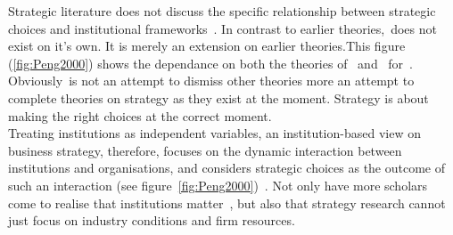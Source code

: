 Strategic literature does not discuss the specific relationship between strategic choices and institutional frameworks~\cite{Peng:2008}.
In contrast to earlier theories,~\ibv does not exist on it's own. It is merely an extension on earlier theories.This figure (\ref{fig:Peng2000}) shows the dependance on both the theories of~\cite{Barney:2001} and~\cite{Porter:1980} for~\ibv. 
Obviously~\ibv is not an attempt to dismiss other theories more an attempt to complete theories on strategy as they exist at the moment. 
Strategy is about making the right choices at the correct moment. \\

Treating institutions as independent variables, an institution-based view on business strategy, therefore, focuses on the dynamic interaction between institutions and organisations, and considers strategic choices as the outcome of such an interaction (see figure~\ref{fig:Peng2000})~\cite{Peng:2002}.
Not only have more scholars come to realise that institutions matter~\cite{Powell:1991,Scott:1995}, but also that strategy research cannot just focus on industry conditions and firm resources.~\cite{Khanna:1997}\\


